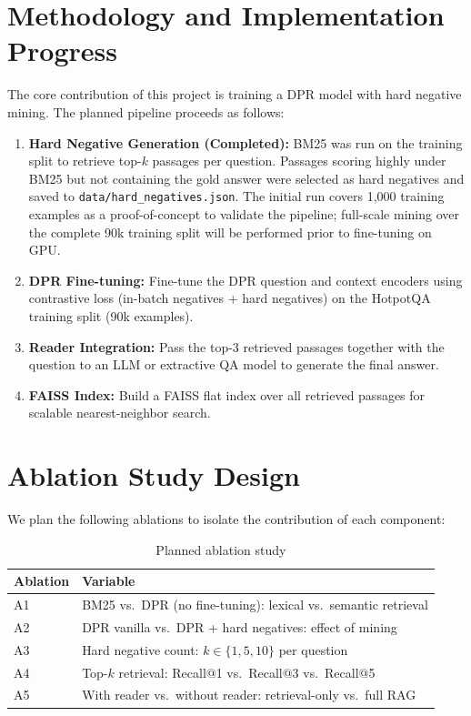 \documentclass[12pt,a4paper]{article}
\begin{document}
\section{Methodology and Implementation Progress}

The core contribution of this project is training a DPR model with hard negative mining.
The planned pipeline proceeds as follows:

\begin{enumerate}[noitemsep]
    \item \textbf{Hard Negative Generation (Completed):} BM25 was run on the training
          split to retrieve top-$k$ passages per question. Passages scoring highly under
          BM25 but not containing the gold answer were selected as hard negatives and
          saved to \texttt{data/hard\_negatives.json}. The initial run covers 1,000
          training examples as a proof-of-concept to validate the pipeline; full-scale
          mining over the complete 90k training split will be performed prior to
          fine-tuning on GPU.
    \item \textbf{DPR Fine-tuning:} Fine-tune the DPR question and context encoders
          using contrastive loss (in-batch negatives + hard negatives) on the HotpotQA
          training split (90k examples).
    \item \textbf{Reader Integration:} Pass the top-3 retrieved passages together with
          the question to an LLM or extractive QA model to generate the final answer.
    \item \textbf{FAISS Index:} Build a FAISS flat index over all retrieved passages for
          scalable nearest-neighbor search.
\end{enumerate}

\section{Ablation Study Design}

We plan the following ablations to isolate the contribution of each component:

\begin{table}[h]
\centering
\begin{tabular}{ll}
\toprule
\textbf{Ablation} & \textbf{Variable} \\
\midrule
A1 & BM25 vs.\ DPR (no fine-tuning): lexical vs.\ semantic retrieval \\
A2 & DPR vanilla vs.\ DPR + hard negatives: effect of mining \\
A3 & Hard negative count: $k \in \{1, 5, 10\}$ per question \\
A4 & Top-$k$ retrieval: Recall@1 vs.\ Recall@3 vs.\ Recall@5 \\
A5 & With reader vs.\ without reader: retrieval-only vs.\ full RAG \\
\bottomrule
\end{tabular}
\caption{Planned ablation study}
\end{table}
\end{document}
